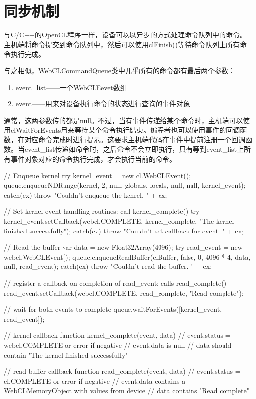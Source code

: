 \section{同步机制}

与C/C++的OpenCL程序一样，设备可以以异步的方式处理命令队列中的命令。主机端将命令提交到命令队列中，然后可以使用clFinish()等待命令队列上所有命令执行完成。

与之相似，WebCLCommandQueue类中几乎所有的命令都有最后两个参数：

\begin{enumerate}
\item event\_\allowbreak{}list——一个WebCLEevet数组
\item event——用来对设备执行命令的状态进行查询的事件对象
\end{enumerate}

通常，这两参数传的都是null。不过，当有事件传递给某个命令时，主机端可以使用clWaitForEvents用来等待某个命令执行结束。编程者也可以使用事件的回调函数，在对应命令完成时进行提示。这要求主机端代码在事件中提前注册一个回调函数。当event\_\allowbreak{}list传递如命令时，之后命令不会立即执行，只有等到event\_\allowbreak{}list上所有事件对象对应的命令执行完成，才会执行当前的命令。

\begin{codebox}[javascript]
// Enqueue kernel
try{
  kernel_event = new cl.WebCLEvent();
  queue.enqueueNDRange(kernel, 2, null, globals, locals, null, null, kernel_event);
} catch(ex) {
  throw "Couldn't enqueue the kenrel. " + ex;
}

// Set kernel event handling routines: call kernel_complete()
try{
  kernel_event.setCallback(webcl.COMPLETE, kernel_complete, "The kernel finished successfully");
} catch(ex){
  throw "Couldn't set callback for event. " + ex;
}

// Read the buffer
var data = new Float32Array(4096);
try{
  read_event = new webcl.WebCLEvent();
  queue.enqueueReadBuffer(clBuffer, false, 0, 4096 * 4, data, null, read_event);
} catch(ex){
  throw "Couldn't read the buffer. " + ex;
}

// register a callback on completion of read_event: calls read_complete()
read_event.setCallback(webcl.COMPLETE, read_complete, "Read complete");

// wait for both events to complete
queue.waitForEvents([kernel_event, read_event]);

// kernel callback
function kernel_complete(event, data){
  // event.status = webcl.COMPLETE or error if negative
  // event.data is null
  // data should contain "The kernel finished successfully"
}

// read buffer callback
function read_complete(event, data){
  // event.status = cl.COMPLETE or error if  negative
  // event.data contains a WebCLMemoryObject with values from device
  // data contains "Read complete"
}
\end{codebox}


